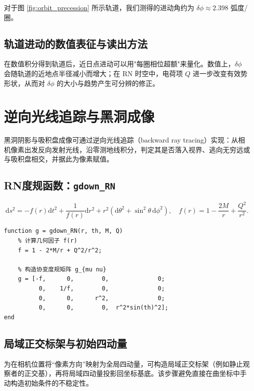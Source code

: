 \documentclass[a4paper,12pt]{article}
\begin{document}
对于图 \ref{fig:orbit_precession} 所示轨道，我们测得的进动角约为 $\delta \phi \approx 2.398$ 弧度/圈。


\subsection{轨道进动的数值表征与读出方法}

在数值积分得到轨道后，近日点进动可以用"每圈相位超额"来量化。数值上，$\delta\phi$ 会随轨道的近地点半径减小而增大；在 RN 时空中，电荷项 $Q$ 进一步改变有效势形状，从而对 $\delta\phi$ 的大小与趋势产生可分辨的修正。



\section{逆向光线追踪与黑洞成像}

黑洞阴影与吸积盘成像可通过逆向光线追踪（backward ray tracing）实现：从相机像素出发反向发射光线，沿零测地线积分，判定其是否落入视界、逃向无穷远或与吸积盘相交，并据此为像素赋值。

\subsection{RN度规函数：\texttt{gdown\_RN}}

\begin{equation}
\mathrm{d}s^2=-f(r)\mathrm{d}t^2+\frac{1}{f(r)}\mathrm{d}r^2+r^2(\mathrm{d}\theta^2+\sin^2\theta\,\mathrm{d}\phi^2),
\quad
f(r)=1-\frac{2M}{r}+\frac{Q^2}{r^2}.
\end{equation}

\begin{lstlisting}[caption={协变度规函数 \texttt{gdown\_RN}}]
function g = gdown_RN(r, th, M, Q)
    % 计算几何因子 f(r)
    f = 1 - 2*M/r + Q^2/r^2;

    % 构造协变度规矩阵 g_{mu nu}
    g = [-f,      0,        0,              0;
          0,    1/f,        0,              0;
          0,      0,      r^2,              0;
          0,      0,        0,  r^2*sin(th)^2];
end
\end{lstlisting}

\subsection{局域正交标架与初始四动量}

为在相机位置将“像素方向”映射为全局四动量，可构造局域正交标架（例如静止观察者的正交基），再将局域四动量投影回坐标基底。该步骤避免直接在曲坐标中手动构造初始条件的不稳定性。
\end{document}
